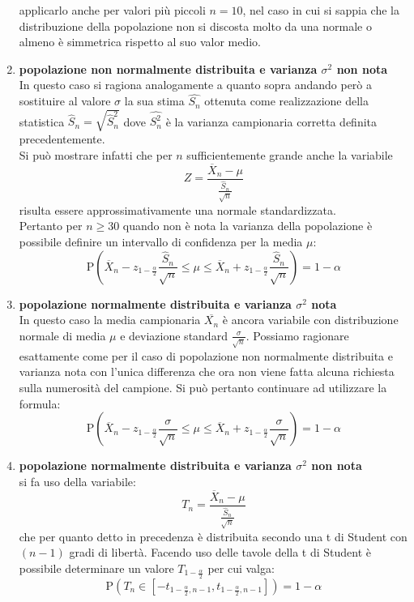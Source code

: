 \documentclass[a4paper,12pt, oneside]{book}
\begin{document}
\begin{enumerate}
  applicarlo anche per valori più piccoli $n=10$, nel caso in cui si sappia che la
distribuzione della popolazione non si discosta molto da una normale o almeno è
simmetrica rispetto al suo valor medio.
\item \textbf{popolazione non normalmente distribuita e varianza $\sigma^2$ non nota}\\
  In questo caso si ragiona analogamente a quanto sopra andando però a sostituire
  al valore $\sigma$ la sua stima $\hat{S_n}$ ottenuta come realizzazione della statistica $\hat{S}_{n}=\sqrt{\hat{S}_{n}^{2}}$ dove $\hat{S_n^2}$ è la varianza campionaria corretta definita precedentemente.\\
  Si può mostrare infatti che per $n$ sufficientemente grande anche la variabile
  \[Z=\frac{\overline{X}_{n}-\mu}{\frac{\hat{S}_{n}}{\sqrt{n}}}\]
  risulta essere approssimativamente una normale standardizzata.\\
  Pertanto per $n\geq 30$ quando non è nota la varianza della popolazione è possibile
  definire un intervallo di confidenza per la media $\mu$:
  \[\mathrm{P}\left(\overline{X}_{n}-z_{1-\frac{\alpha}{2}} \frac{\hat{S}_{n}}{\sqrt{n}} \leq \mu \leq \overline{X}_{n}+z_{1-\frac{\alpha}{2}} \frac{\hat{S}_{n}}{\sqrt{n}}\right)=1-\alpha\]
\item \textbf{popolazione normalmente distribuita e varianza $\sigma^2$ nota}
  \\In questo caso la media campionaria $\overline{X_n}$ è ancora variabile con distribuzione normale di media $\mu$ e deviazione standard $\frac{\sigma}{\sqrt{n}}$. Possiamo ragionare esattamente come per il caso di popolazione non normalmente
distribuita e varianza nota con l’unica differenza che ora non viene fatta alcuna
richiesta sulla numerosità del campione.
Si può pertanto continuare ad utilizzare la formula:
\[\mathrm{P}\left(\overline{X}_{n}-z_{1-\frac{\alpha}{2}} \frac{\sigma}{\sqrt{n}} \leq \mu \leq \overline{X}_{n}+z_{1 -\frac{\alpha}{2}} \frac{\sigma}{\sqrt{n}}\right)=1-\alpha\]
\item \textbf{popolazione normalmente distribuita e varianza $\sigma^2$ non nota}
  \\ si fa uso della variabile:
  \[T_n=\frac{\overline{X}_n-\mu}{\frac{\hat{S}_n}{\sqrt{n}}}\]
  che per quanto detto in precedenza è distribuita secondo una t di Student con
  $(n-1)$ gradi di libertà. Facendo uso delle tavole della t di Student è possibile determinare un valore $T_{1-\frac{\alpha}{2}}$ per cui valga:
  \[\mathrm{P}\left(T_{n} \in\left[-t_{1-\frac{\alpha}{2}, n-1}, t_{1-\frac{\alpha}{2}, n-1}\right]\right)=1-\alpha\]

\end{enumerate}
\end{document}
